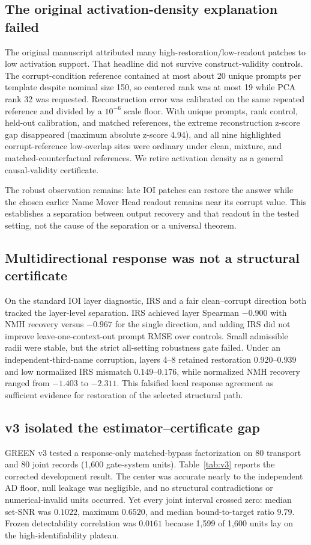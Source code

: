 \documentclass{article}
\begin{document}
\subsection{The original activation-density explanation failed}
The original manuscript attributed many high-restoration/low-readout patches to low activation support. That headline did not survive construct-validity controls. The corrupt-condition reference contained at most about 20 unique prompts per template despite nominal size 150, so centered rank was at most 19 while PCA rank 32 was requested. Reconstruction error was calibrated on the same repeated reference and divided by a $10^{-6}$ scale floor. With unique prompts, rank control, held-out calibration, and matched references, the extreme reconstruction z-score gap disappeared (maximum absolute z-score 4.94), and all nine highlighted corrupt-reference low-overlap sites were ordinary under clean, mixture, and matched-counterfactual references. We retire activation density as a general causal-validity certificate.

The robust observation remains: late IOI patches can restore the answer while the chosen earlier Name Mover Head readout remains near its corrupt value. This establishes a separation between output recovery and that readout in the tested setting, not the cause of the separation or a universal theorem.

\subsection{Multidirectional response was not a structural certificate}
On the standard IOI layer diagnostic, IRS and a fair clean--corrupt direction both tracked the layer-level separation. IRS achieved layer Spearman $-0.900$ with NMH recovery versus $-0.967$ for the single direction, and adding IRS did not improve leave-one-context-out prompt RMSE over controls. Small admissible radii were stable, but the strict all-setting robustness gate failed. Under an independent-third-name corruption, layers 4--8 retained restoration $0.920$--$0.939$ and low normalized IRS mismatch $0.149$--$0.176$, while normalized NMH recovery ranged from $-1.403$ to $-2.311$. This falsified local response agreement as sufficient evidence for restoration of the selected structural path.

\subsection{v3 isolated the estimator--certificate gap}
GREEN v3 tested a response-only matched-bypass factorization on 80 transport and 80 joint records (1,600 gate-system units). Table~\ref{tab:v3} reports the corrected development result. The center was accurate nearly to the independent AD floor, null leakage was negligible, and no structural contradictions or numerical-invalid units occurred. Yet every joint interval crossed zero: median set-SNR was $0.1022$, maximum $0.6520$, and median bound-to-target ratio $9.79$. Frozen detectability correlation was $0.0161$ because 1,599 of 1,600 units lay on the high-identifiability plateau.
\end{document}
